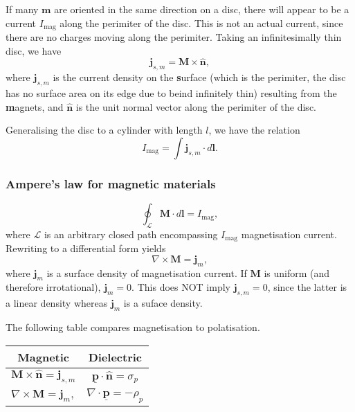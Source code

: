 \documentclass[a4paper, 12pt]{article}
\renewcommand{\vec}[1]{\bm{#1}}
\newcommand{\p}{\ensuremath{\vec{\underline{p}}}}
\renewcommand{\j}{\ensuremath{\vec{j}}}
\let\tmp\hat
\renewcommand{\hat}[1]{\vec{\tmp{#1}}}
\begin{document}
            If many $\vec{m}$ are oriented in the same direction on a disc, 
            there will appear to be a current $I_{\text{mag}}$ along the perimiter of the disc. 
            This is not an actual current, since there are no charges moving along the perimiter.
            Taking an infinitesimally thin disc, we have 
            \begin{equation}
                \j_{s, m} = \vec{M}\times\hat{n},
            \end{equation}
            where $\j_{s, m}$ is the current density on the \textbf{s}urface 
            (which is the perimiter, the disc has no surface area on its edge due to beind infinitely thin) 
            resulting from the \textbf{m}agnets, and $\hat{n}$ is the unit normal vector along the perimiter of the disc. 

            Generalising the disc to a cylinder with length $l$, we have the relation
            \begin{equation}
                I_{\text{mag}} = \int \j_{s, m}\cdot d\vec{l}.
            \end{equation}

        \subsubsection{Ampere's law for magnetic materials}
            \begin{equation}
                \oint_\mathcal{L}\vec{M}\cdot d\vec{l} = I_{\text{mag}},
            \end{equation}
            where $\mathcal{L}$ is an arbitrary closed path encompassing $I_{\text{mag}}$ magnetisation current. 
            Rewriting to a differential form yields
            \begin{equation}
                \nabla \times \vec{M} = \j_m,
            \end{equation}
            where $\j_m$ is a surface density of magnetisation current. 
            If $\vec{M}$ is uniform (and therefore irrotational), $\j_m = 0$. 
            This does NOT imply $\j_{s, m} = 0$, since the latter is a linear density whereas $\j_m$ is a suface density.

            The following table compares magnetisation to polatisation.
            \begin{center}
                \begin{tabular}{ c|c } 
                Magnetic & Dielectric \\
                \hline
                 $\vec{M}\times\hat{n} = \j_{s, m}$ & $\p \cdot \hat{n} = \sigma_p$ \\
                 $\nabla \times \vec{M} = \j_m,$ & $\nabla \cdot \p = -\rho_p$
                \end{tabular}
            \end{center}
\end{document}
